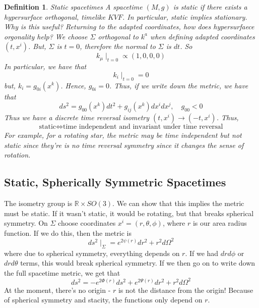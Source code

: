 \documentclass[11pt, oneside]{article}   	%
\theoremstyle{slanted}
\newtheorem*{defn}{Definition}
\begin{document}
\begin{defn}{Static spacetimes}
A spacetime  $ \left( M , g  \right)  $ is static 
if there exists a hypersurface orthogonal, timelike $ KVF$. 
In particular, static implies stationary. 
Why is this useful? Returning to the adapted coordinates, 
how does hypersurfaece orgonality help? 
We choose $ \Sigma $ orthogonal to $ k ^ a $ when defining 
adapted coordinates $ \left(  t, x ^ i  \right)   $. 
But, $ \Sigma $ is $  t = 0$, therefore the normal 
to $ \Sigma $ is $ dt $. 
So
\[
	k _ \mu \mid _{ t = 0 } \propto \left( 1, 0 , 0 , 0  \right) 
\] In particular, we have that \[
 k _i \mid _{ t = 0 }  =0 
\] but, $ k _ i  = g _{ 0i } \left( x ^ k  \right)  $. 
Hence, $ g _{ 0i }  = 0$.
Thus, if we write down the metric, 
we have that 
\[
 ds ^ 2  = g _{ 00 } \left( x ^ k  \right)  dt ^ 2 + 
 g _{ ij} \left( x ^ k  \right)  dx ^ i dx ^ j , \quad g _{ 00 } < 0 
\] Thus we have a discrete time reversal isometry $ \left( t , x ^ i  \right)  \to 
\left(  - t , x ^ i  \right)  $. 
Thus,  
\[
\text{static} \iff \text{time independent and invariant under time reversal}
\] For example, for a rotating star, the metric 
may be time independent but not static since they're is no 
time reversal symmetry since it changes the sense of rotation. 
\end{defn}

\subsection{Static, Spherically Symmetric Spacetimes}
The isometry group is $ \mathbb{ R } \times SO ( 3 )$. 
We can show that this implies the metric must be static. 
If it wasn't static, it would be rotating, but that breaks spherical symmetry. 
On $ \Sigma $ choose coordinates $ x^ i  = \left(  r, \theta , \phi   \right)  $, 
where $ r $ is our area radius function. 
If we do this, then the metric 
is 
\[
ds ^ 2 \mid_{ \Sigma }  = e ^{ 2 \psi ( r )  } dr ^ 2 + r ^2 d \Omega ^ 2 
\]  where due to spherical symmetry, everything depends on $ r $. 
If we had $ dr d \phi $ or $ dr d \theta $ terms, 
this would break spherical symmetry. 
If we then go on to write down the full spacetime 
metric, we 
get that 
\[
ds ^ 2   =  - e ^{ 2 \Phi ( r ) } ds ^ 2 + e ^{ 2 \Psi ( r ) } dr ^ 2 + r ^ 2 d \Omega ^ 2 
\] At the moment, there's no origin  - $ r $ is not the distance from 
the origin! Because of spherical symmetry 
and stacity, the functions only depend on $ r$. 
\end{document}
